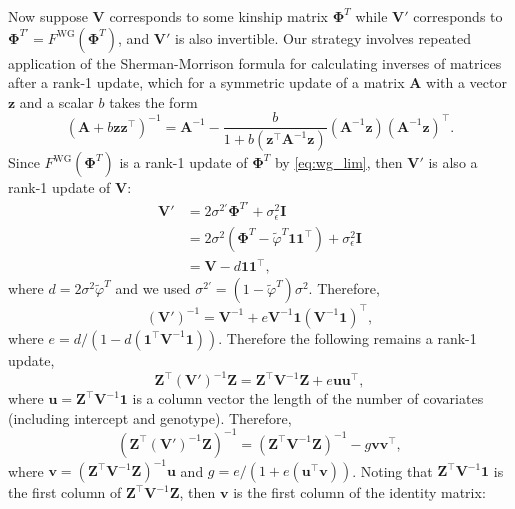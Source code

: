 \documentclass[9pt,twocolumn,twoside]{gsajnl}
\newcommand{\kinMat}[1][T]{\mathbf{\Phi}^{#1}}
\newcommand{\kinMatPrime}{\mathbf{\Phi}^{T\prime}}
\begin{document}
\begin{appendices}
  Now suppose $\mathbf{V}$ corresponds to some kinship matrix $\kinMat$ while $\mathbf{V}'$ corresponds to $\kinMatPrime = F^\text{WG}(\kinMat)$, and $\mathbf{V}'$ is also invertible.
  Our strategy involves repeated application of the Sherman-Morrison formula for calculating inverses of matrices after a rank-1 update, which for a symmetric update of a matrix $\mathbf{A}$ with a vector $\mathbf{z}$ and a scalar $b$ takes the form \citep{sherman_adjustment_1950}
  $$
  \left( \mathbf{A} + b \mathbf{z}\mathbf{z}^\intercal \right)^{-1}
  =
  \mathbf{A}^{-1} - \frac{
    b
  }{
    1 + b \left( \mathbf{z}^\intercal \mathbf{A}^{-1} \mathbf{z} \right)
  }
  \left( \mathbf{A}^{-1} \mathbf{z} \right) \left( \mathbf{A}^{-1} \mathbf{z} \right)^\intercal
  .
  $$
  Since $F^\text{WG}(\kinMat)$ is a rank-1 update of $\kinMat$ by \cref{eq:wg_lim}, then $\mathbf{V}'$ is also a rank-1 update of $\mathbf{V}$:
  \begin{align*}
    \mathbf{V}'
    &=
      2 \sigma^{2\prime} \kinMatPrime + \sigma^2_\epsilon \mathbf{I}
      \\
    &=
      2 \sigma^2 \left( \kinMat - \tilde{\varphi}^T \mathbf{1}\mathbf{1}^\intercal \right)
      + \sigma^2_\epsilon \mathbf{I}
      \\
    &=
    \mathbf{V} - d \mathbf{1}\mathbf{1}^\intercal
    ,
  \end{align*}
  where $d = 2 \sigma^2 \tilde{\varphi}^T$ and we used $\sigma^{2\prime} = \left( 1 - \tilde{\varphi}^T \right) \sigma^2$.
  Therefore,
  $$
  \left( \mathbf{V}' \right)^{-1}
  =
  \mathbf{V}^{-1} + e \mathbf{V}^{-1} \mathbf{1} \left( \mathbf{V}^{-1} \mathbf{1} \right)^\intercal
  ,
  $$
  where $e = d / \left( 1 - d \left( \mathbf{1}^\intercal \mathbf{V}^{-1} \mathbf{1} \right) \right)$.
  Therefore the following remains a rank-1 update,
  $$
  \mathbf{Z}^\intercal \left( \mathbf{V}' \right)^{-1} \mathbf{Z}
  =
  \mathbf{Z}^\intercal \mathbf{V}^{-1} \mathbf{Z} + e \mathbf{u} \mathbf{u}^\intercal
  ,
  $$
  where $\mathbf{u} = \mathbf{Z}^\intercal \mathbf{V}^{-1} \mathbf{1}$ is a column vector the length of the number of covariates (including intercept and genotype).
  Therefore, 
  $$
  \left( \mathbf{Z}^\intercal \left( \mathbf{V}' \right)^{-1} \mathbf{Z} \right)^{-1}
  =
  \left( \mathbf{Z}^\intercal \mathbf{V}^{-1} \mathbf{Z} \right)^{-1}
  - g \mathbf{v} \mathbf{v}^\intercal
  ,
  $$
  where $\mathbf{v} = \left( \mathbf{Z}^\intercal \mathbf{V}^{-1} \mathbf{Z} \right)^{-1} \mathbf{u}$
  and $g = e/(1 + e (\mathbf{u}^\intercal \mathbf{v}))$.
  Noting that $\mathbf{Z}^\intercal \mathbf{V}^{-1} \mathbf{1}$ is the first column of $\mathbf{Z}^\intercal \mathbf{V}^{-1} \mathbf{Z}$, then $\mathbf{v}$ is the first column of the identity matrix:

\end{appendices}
\end{document}
